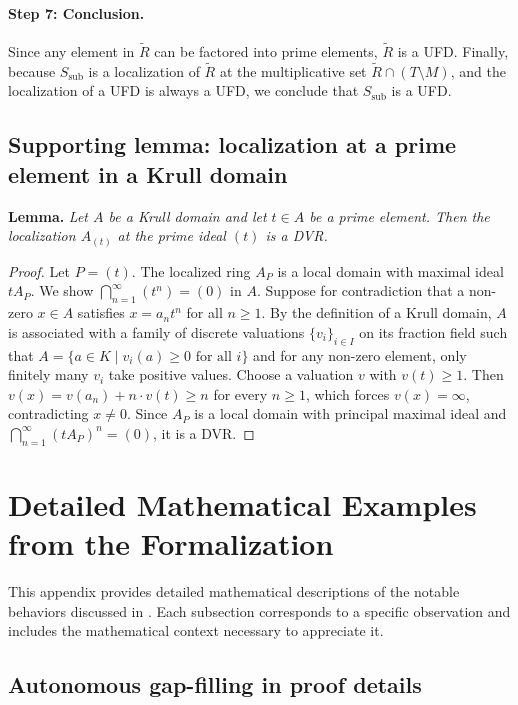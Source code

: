 \documentclass[]{pkuai4m}
\theoremstyle{plain}
\theoremstyle{definition}
\begin{document}
\paragraph{Step 7: Conclusion.} Since any element in $\tilde{R}$ can be factored into prime elements, $\tilde{R}$ is a UFD. Finally, because $S_{\mathrm{sub}}$ is a localization of $\tilde{R}$ at the multiplicative set $\tilde{R} \cap (T \setminus M)$, and the localization of a UFD is always a UFD, we conclude that $S_{\mathrm{sub}}$ is a UFD.

\subsection*{Supporting lemma: localization at a prime element in a Krull domain}

\noindent\textbf{Lemma.} \textit{Let $A$ be a Krull domain and let $t \in A$ be a prime element. Then the localization $A_{(t)}$ at the prime ideal $(t)$ is a DVR.}

\begin{proof}
Let $P = (t)$. The localized ring $A_P$ is a local domain with maximal ideal $tA_P$. We show $\bigcap_{n=1}^{\infty} (t^n) = (0)$ in $A$. Suppose for contradiction that a non-zero $x \in A$ satisfies $x = a_n t^n$ for all $n \geq 1$. By the definition of a Krull domain, $A$ is associated with a family of discrete valuations $\{v_i\}_{i \in I}$ on its fraction field such that $A = \{a \in K \mid v_i(a) \geq 0 \text{ for all } i\}$ and for any non-zero element, only finitely many $v_i$ take positive values. Choose a valuation $v$ with $v(t) \geq 1$. Then $v(x) = v(a_n) + n \cdot v(t) \geq n$ for every $n \geq 1$, which forces $v(x) = \infty$, contradicting $x \neq 0$. Since $A_P$ is a local domain with principal maximal ideal and $\bigcap_{n=1}^{\infty} (tA_P)^n = (0)$, it is a DVR.
\end{proof}


\section{Detailed Mathematical Examples from the Formalization}\label{appendix:detailed-examples}

This appendix provides detailed mathematical descriptions of the notable behaviors discussed in . Each subsection corresponds to a specific observation and includes the mathematical context necessary to appreciate it.

\subsection{Autonomous gap-filling in proof details}\label{subsubsec:gap-filling}
\end{document}
